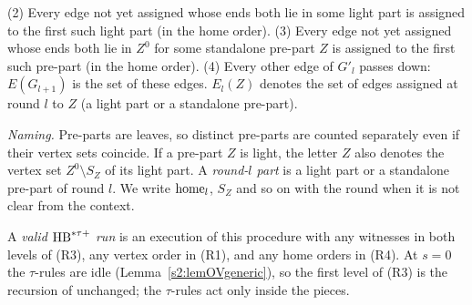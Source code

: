 \begin{definition}
\begin{enumerate}
(2) Every edge not yet assigned whose ends both lie in some light part is
assigned to the first such light part (in the home order).
(3) Every edge not yet assigned whose ends both lie in $Z^0$ for some
standalone pre-part $Z$ is assigned to the first such pre-part (in the home
order).
(4) Every other edge of $G'_l$ passes down: $E(G_{l+1})$ is the set of these
edges.
$E_l(Z)$ denotes the set of edges assigned at round $l$ to $Z$ (a light part or
a standalone pre-part).
\end{enumerate}
\emph{Naming.} Pre-parts are leaves, so distinct pre-parts are counted
separately even if their vertex sets coincide. If a pre-part $Z$ is light, the
letter $Z$ also denotes the vertex set $Z^0\setminus S_Z$ of its light part.
A \emph{round-$l$ part} is a light part or a standalone pre-part of round $l$.
We write $\mathrm{home}_l$, $S_Z$ and so on with the round when it is not clear from
the context.

A \emph{valid $\mathrm{HB}^{*\tau{+}}$ run} is an execution of this procedure with any
witnesses in both levels of (R3), any vertex order in (R1), and any home
orders in (R4). At $s=0$ the $\tau$-rules are idle
(Lemma~\ref{s2:lemOVgeneric}), so the first level of (R3) is the recursion
of \cite{BM} unchanged; the $\tau$-rules act only inside the pieces.
\deps{\ref{s1:citLem14}, \ref{s2:lem14tau}, \ref{s1:defConstants}, \ref{s2:lemOVgeneric}, \ref{s2:lemSEP}}
\end{definition}

